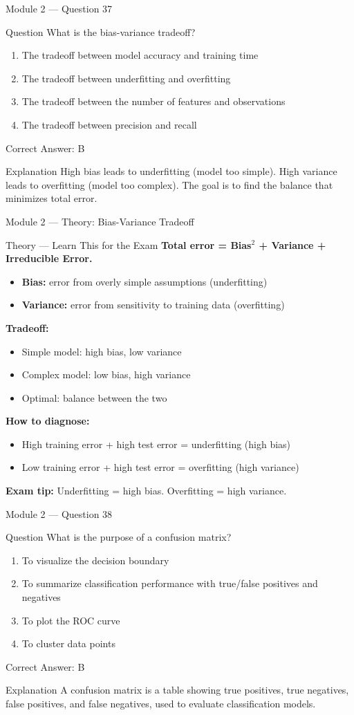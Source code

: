 \documentclass[aspectratio=169,10pt]{beamer}
\newcommand{\question}[1]{%
	\begin{block}{Question}
		#1
	\end{block}
}
\newcommand{\options}[4]{%
	\begin{enumerate}[label=\Alph*.,leftmargin=*]
		\item #1
		\item #2
		\item #3
		\item #4
	\end{enumerate}
}
\newcommand{\answerbox}[1]{%
	\begin{exampleblock}{Correct Answer: #1}
	\end{exampleblock}
}
\newcommand{\explain}[1]{%
	\begin{block}{Explanation}
		\small #1
	\end{block}
}
\newcommand{\theory}[1]{%
	\begin{block}{Theory --- Learn This for the Exam}
		\small #1
	\end{block}
}
\begin{document}
	\begin{frame}{Module 2 --- Question 37}
		\question{What is the bias-variance tradeoff?}
		\options{The tradeoff between model accuracy and training time}{The tradeoff between underfitting and overfitting}{The tradeoff between the number of features and observations}{The tradeoff between precision and recall}
		\answerbox{B}
		\explain{High bias leads to underfitting (model too simple). High variance leads to overfitting (model too complex). The goal is to find the balance that minimizes total error.}
	\end{frame}
	
	\begin{frame}{Module 2 --- Theory: Bias-Variance Tradeoff}
		\theory{
			\textbf{Total error = Bias$^2$ + Variance + Irreducible Error.}
			\begin{itemize}
				\item \textbf{Bias:} error from overly simple assumptions (underfitting)
				\item \textbf{Variance:} error from sensitivity to training data (overfitting)
			\end{itemize}
			\textbf{Tradeoff:}
			\begin{itemize}
				\item Simple model: high bias, low variance
				\item Complex model: low bias, high variance
				\item Optimal: balance between the two
			\end{itemize}
			\textbf{How to diagnose:}
			\begin{itemize}
				\item High training error + high test error = underfitting (high bias)
				\item Low training error + high test error = overfitting (high variance)
			\end{itemize}
			\textbf{Exam tip:} Underfitting = high bias. Overfitting = high variance.
		}
	\end{frame}
	
	\begin{frame}{Module 2 --- Question 38}
		\question{What is the purpose of a confusion matrix?}
		\options{To visualize the decision boundary}{To summarize classification performance with true/false positives and negatives}{To plot the ROC curve}{To cluster data points}
		\answerbox{B}
		\explain{A confusion matrix is a table showing true positives, true negatives, false positives, and false negatives, used to evaluate classification models.}
	\end{frame}
	
\end{document}
